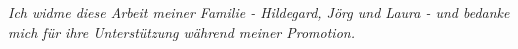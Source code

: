 
\begin{dedication} 

\textit{Ich widme diese Arbeit meiner Familie - Hildegard, J\"org und Laura - und bedanke mich f\"ur ihre Unterst\"utzung w\"ahrend meiner Promotion.}

\end{dedication}

